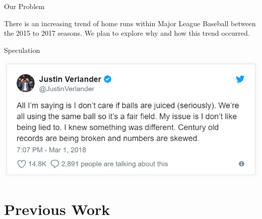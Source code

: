 \documentclass[14pt]{bredelebeamer}
\begin{document}
\begin{frame}

\begin{block}{\large Our Problem}

{\large There is an increasing trend of home runs within Major League Baseball between the 2015 to 2017 seasons. We plan to explore why and how this trend occurred.\\}

\end{block}

 

\end{frame}


\begin{frame}{Speculation}

\includegraphics[scale = 0.8]{images/Verlander.PNG}

\end{frame}


\section{Previous Work}
\end{document}
